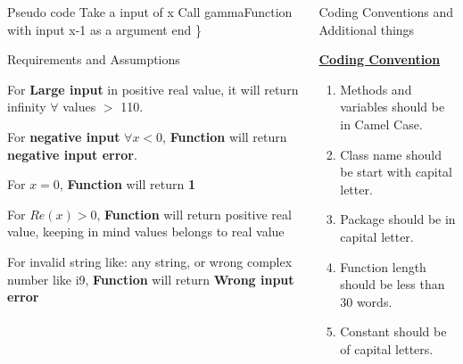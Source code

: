 \documentclass[final]{beamer}
\newlength{\onecolwid}
\newlength{\twocolwid}
\begin{document}
\begin{frame}
\begin{columns}[t]
\begin{column}{\twocolwid}
\begin{columns}[t,totalwidth=\twocolwid]
\begin{column}{\onecolwid}
\begin{exampleblock}{Pseudo code}
{\hspace*{20pt} Take a input of x \newline
\hspace*{20pt} Call gammaFunction with input x-1 as a argument \newline
end
\}}
\end{exampleblock}
\begin{exampleblock}{Requirements and Assumptions}
\begin{itemize}
    \small{\item  For \textbf{Large input} in positive real value, it will return infinity $\forall$ values $>$ 110.
    \item  For \textbf{negative input} $\forall x<0 $, \textbf{Function} will return \textbf{negative input error}.
    \item  For \textbf{$x=0$}, \textbf{Function} will return \textbf{1}
    \item  For \textbf{$Re(x) > 0$}, \textbf{Function} will return positive real value, keeping in mind values belongs to real value}
    \item For invalid string like: any string, or wrong complex number like i9, \textbf{Function} will return \textbf{Wrong input error}
\end{itemize}

\end{exampleblock}

\end{column} %

\begin{column}{\onecolwid}\vspace{-.74in} %


\begin{exampleblock}{Coding Conventions and Additional things}

\small{\textbf{\underline{Coding Convention}}
\begin{enumerate}
    \item Methods and variables should be in Camel Case. 
    \item Class name should be start with capital letter.
    \item Package should be in capital letter.
    \item Function length should be less than 30 words.
    \item Constant should be of capital letters.
\end{enumerate}

}
\end{exampleblock}
\end{column}
\end{columns}
\end{column}
\end{columns}
\end{frame}
\end{document}
